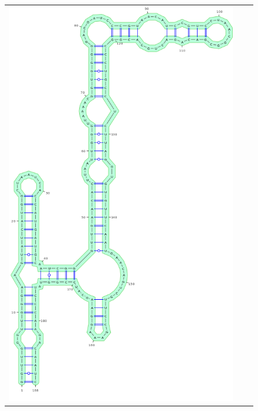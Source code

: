 \documentclass[11pt]{article} %
\begin{document}
\begin{figure}[H]
{\begin{adjustbox}{max width=\textwidth,max height=\textheight,keepaspectratio}
\begin{tabular}{@{}ccc@{}}
 \includegraphics[scale=\MyScale]{graphs/Supp_structures/1M7CE_NMIACE}

\end{tabular}
\end{adjustbox}}
\end{figure}
\end{document}
